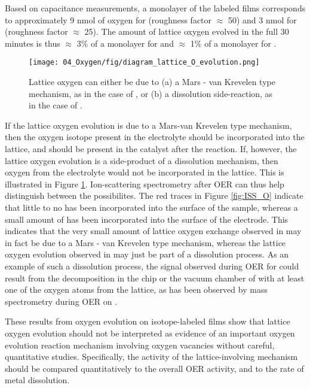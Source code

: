 Based on capacitance measurements, a monolayer of the labeled films corresponds to approximately 9 nmol of oxygen for  (roughness factor $\approx$ 50) and 3 nmol for  (roughness factor $\approx$ 25). The amount of lattice oxygen evolved in the full 30 minutes is thus $\approx$ 3\% of a monolayer for  and $\approx$ 1\% of a monolayer for .

\begin{figure}[t]
	\texttt{[image: 04\_Oxygen/fig/diagram\_lattice\_O\_evolution.png]}
	\caption{Lattice oxygen can either be due to (a) a Mars - van Krevelen type mechanism, as in the case of , or (b) a dissolution side-reaction, as in the case of .}
	\label{fig:exchange_diagram}
\end{figure}

If the lattice oxygen evolution is due to a Mars-van Krevelen type mechanism, then the oxygen isotope present in the electrolyte should be incorporated into the lattice, and should be present in the catalyst after the reaction. If, however, the lattice oxygen evolution is a side-product of a dissolution mechanism, then oxygen from the electrolyte would not be incorporated in the lattice. This is illustrated in Figure \ref{fig:exchange_diagram}. Ion-scattering spectrometry after OER can thus help distinguish between the possibilites. The red traces in Figure \ref{fig:ISS_O} indicate that little to no  has been incorporated into the surface of the  sample, whereas a small amount of  has been incorporated into the surface of the  electrode. This indicates that the very small amount of lattice oxygen exchange observed in  may in fact be due to a Mars - van Krevelen type mechanism, whereas the lattice oxygen evolution observed in  may just be part of a dissolution process. As an example of such a dissolution process, the  signal observed during OER for  could result from the decomposition in the chip or the vacuum chamber of  with at least one of the oxygen atoms from the lattice, as  has been observed by mass spectrometry during OER on .\cite{Geiger2018} 

These results from oxygen evolution on isotope-labeled films show that lattice oxygen evolution should not be interpreted as evidence of an important oxygen evolution reaction mechanism involving oxygen vacancies without careful, quantitative studies. Specifically, the activity of the lattice-involving mechanism should be compared quantitatively to the overall OER activity, and to the rate of metal dissolution. 

